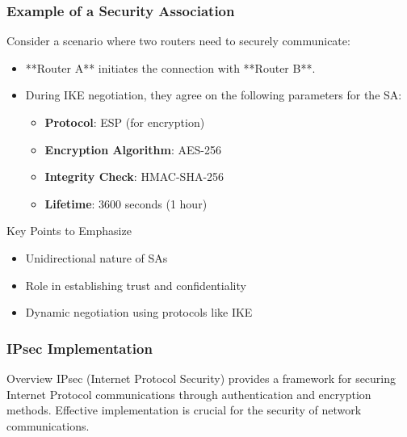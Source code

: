 \documentclass{beamer}
\begin{document}
\begin{frame}[fragile]
    \frametitle{Example of a Security Association}
    Consider a scenario where two routers need to securely communicate:
    \begin{itemize}
        \item **Router A** initiates the connection with **Router B**.
        \item During IKE negotiation, they agree on the following parameters for the SA:
        \begin{itemize}
            \item \textbf{Protocol}: ESP (for encryption)
            \item \textbf{Encryption Algorithm}: AES-256
            \item \textbf{Integrity Check}: HMAC-SHA-256
            \item \textbf{Lifetime}: 3600 seconds (1 hour)
        \end{itemize}
    \end{itemize}
    \begin{block}{Key Points to Emphasize}
        \begin{itemize}
            \item Unidirectional nature of SAs
            \item Role in establishing trust and confidentiality
            \item Dynamic negotiation using protocols like IKE
        \end{itemize}
    \end{block}
\end{frame}

\begin{frame}
    \frametitle{IPsec Implementation}
    \begin{block}{Overview}
        IPsec (Internet Protocol Security) provides a framework for securing Internet Protocol communications through authentication and encryption methods. Effective implementation is crucial for the security of network communications.
    \end{block}
\end{frame}
\end{document}
